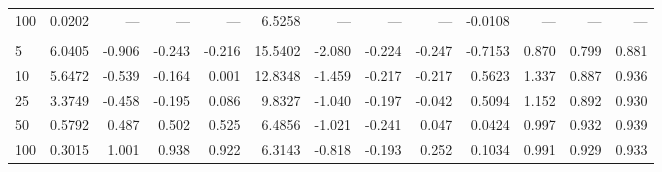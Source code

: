 \begin{tabular}{lrrrrrrrrrrrr}
100 & 0.0202 & --- & --- & --- & 6.5258 & --- & --- & --- & -0.0108 & --- & --- & --- \\
\addlinespace
\multicolumn{13}{l}{\textit{Sin-Het}} \\
5 & 6.0405 & -0.906 & -0.243 & -0.216 & 15.5402 & -2.080 & -0.224 & -0.247 & -0.7153 & 0.870 & 0.799 & 0.881 \\
10 & 5.6472 & -0.539 & -0.164 & 0.001 & 12.8348 & -1.459 & -0.217 & -0.217 & 0.5623 & 1.337 & 0.887 & 0.936 \\
25 & 3.3749 & -0.458 & -0.195 & 0.086 & 9.8327 & -1.040 & -0.197 & -0.042 & 0.5094 & 1.152 & 0.892 & 0.930 \\
50 & 0.5792 & 0.487 & 0.502 & 0.525 & 6.4856 & -1.021 & -0.241 & 0.047 & 0.0424 & 0.997 & 0.932 & 0.939 \\
100 & 0.3015 & 1.001 & 0.938 & 0.922 & 6.3143 & -0.818 & -0.193 & 0.252 & 0.1034 & 0.991 & 0.929 & 0.933 \\
\bottomrule
\end{tabular}
